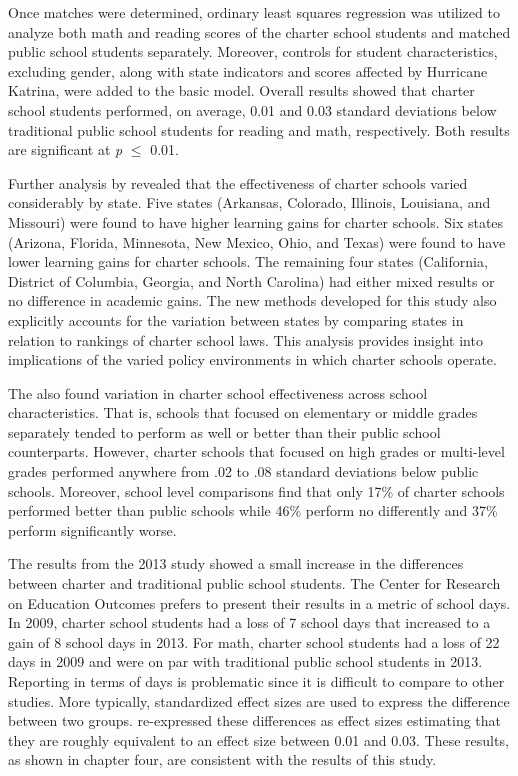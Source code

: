 \documentclass[letterpaper,12pt]{article} %
\begin{document}
Once matches were determined, ordinary least squares regression was utilized to analyze both math and reading scores of the charter school students and matched public school students separately. Moreover, controls for student characteristics, excluding gender, along with state indicators and scores affected by Hurricane Katrina, were added to the basic model. Overall results showed that charter school students performed, on average, 0.01 and 0.03 standard deviations below traditional public school students for reading and math, respectively. Both results are significant at \textit{p} $\leq$ 0.01.

Further analysis by  revealed that the effectiveness of charter schools varied considerably by state. Five states (Arkansas, Colorado, Illinois, Louisiana, and Missouri) were found to have higher learning gains for charter schools. Six states (Arizona, Florida, Minnesota, New Mexico, Ohio, and Texas) were found to have lower learning gains for charter schools. The remaining four states (California, District of Columbia, Georgia, and North Carolina) had either mixed results or no difference in academic gains. The new methods developed for this study also explicitly accounts for the variation between states by comparing states in relation to rankings of charter school laws. This analysis provides insight into implications of the varied policy environments in which charter schools operate.

The  also found variation in charter school effectiveness across school characteristics. That is, schools that focused on elementary or middle grades separately tended to perform as well or better than their public school counterparts. However, charter schools that focused on high grades or multi-level grades performed anywhere from .02 to .08 standard deviations below public schools. Moreover, school level comparisons find that only 17\% of charter schools performed better than public schools while 46\% perform no differently and 37\% perform significantly worse.

The results from the 2013 study \cite{credo2013} showed a small increase in the differences between charter and traditional public school students. The Center for Research on Education Outcomes prefers to present their results in a metric of school days. In 2009, charter school students had a loss of 7 school days that increased to a gain of 8 school days in 2013. For math, charter school students had a loss of 22 days in 2009 and were on par with traditional public school students in 2013. Reporting in terms of days is problematic since it is difficult to compare to other studies. More typically, standardized effect sizes are used to express the difference between two groups.  re-expressed these differences as effect sizes estimating that they are roughly equivalent to an effect size between 0.01 and 0.03. These results, as shown in chapter four, are consistent with the results of this study. 
\end{document}
